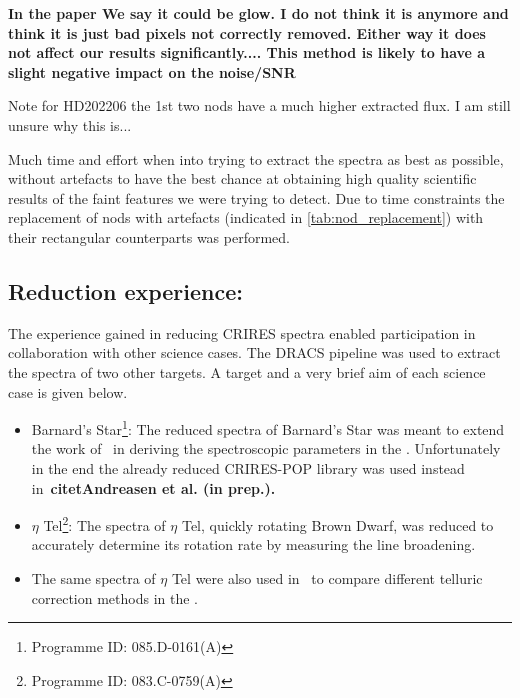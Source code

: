 

\textbf{In the paper We say it could be glow. I do not think it is anymore and think it is just bad pixels not correctly removed. Either way it does not affect our results significantly....
This method is likely to have a slight negative impact on the noise/SNR}

Note for HD202206 the 1st two nods have a much higher extracted flux. I am still unsure why this is...


Much time and effort when into trying to extract the spectra as best as possible, without artefacts to have the best chance at obtaining high quality scientific results of the faint features we were trying to detect.
Due to time constraints the replacement of nods with artefacts (indicated in \ref{tab:nod_replacement}) with their rectangular counterparts was performed.

\subsection{Reduction experience:}
\label{subsec:experience}
The experience gained in reducing CRIRES spectra enabled participation in collaboration with other science cases. The DRACS pipeline was used to extract the spectra of two other targets. A target and a very brief aim of each science case is given below.
\begin{itemize}
\item Barnard's Star\footnote{Programme ID: 085.D-0161(A)}: The reduced \nir{} spectra of Barnard's Star was meant to extend the work of~\citet{andreasen_nearinfrared_2016} in deriving the spectroscopic parameters in the \nir. Unfortunately in the end the already reduced CRIRES-POP library was used instead in~\bf{citet{Andreasen et al. (in prep.)}}. 
\item $\eta$ Tel\footnote{Programme ID: 083.C-0759(A)}: The spectra of {$\eta$ Tel}, quickly rotating Brown Dwarf, was reduced to accurately determine its rotation rate by measuring the line broadening. 
\item The same spectra of $\eta$ Tel were also used in~\citet{ulmer-moll_telluric_2018} to compare different telluric correction methods in the \nir.
\end{itemize}

